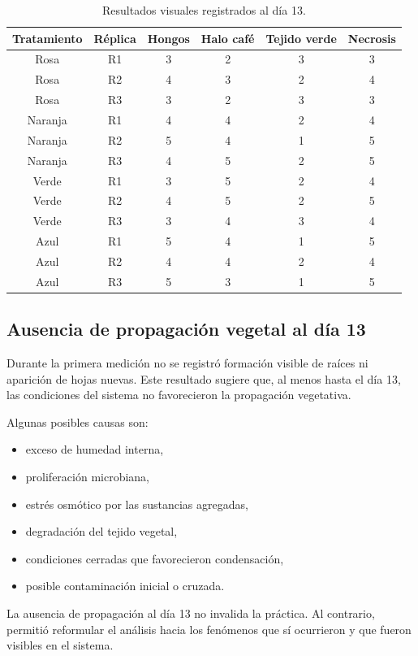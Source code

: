 \begin{table}[H]
\centering
\begin{tabular}{cccccc}
\hline
Tratamiento & Réplica & Hongos & Halo café & Tejido verde & Necrosis \\
\hline
Rosa & R1 & 3 & 2 & 3 & 3 \\
Rosa & R2 & 4 & 3 & 2 & 4 \\
Rosa & R3 & 3 & 2 & 3 & 3 \\
Naranja & R1 & 4 & 4 & 2 & 4 \\
Naranja & R2 & 5 & 4 & 1 & 5 \\
Naranja & R3 & 4 & 5 & 2 & 5 \\
Verde & R1 & 3 & 5 & 2 & 4 \\
Verde & R2 & 4 & 5 & 2 & 5 \\
Verde & R3 & 3 & 4 & 3 & 4 \\
Azul & R1 & 5 & 4 & 1 & 5 \\
Azul & R2 & 4 & 4 & 2 & 4 \\
Azul & R3 & 5 & 3 & 1 & 5 \\
\hline
\end{tabular}
\caption{Resultados visuales registrados al día 13.}
\end{table}

\subsection{Ausencia de propagación vegetal al día 13}

Durante la primera medición no se registró formación visible de raíces ni aparición de hojas nuevas. Este resultado sugiere que, al menos hasta el día 13, las condiciones del sistema no favorecieron la propagación vegetativa.

Algunas posibles causas son:

\begin{itemize}
\item exceso de humedad interna,
\item proliferación microbiana,
\item estrés osmótico por las sustancias agregadas,
\item degradación del tejido vegetal,
\item condiciones cerradas que favorecieron condensación,
\item posible contaminación inicial o cruzada.
\end{itemize}

La ausencia de propagación al día 13 no invalida la práctica. Al contrario, permitió reformular el análisis hacia los fenómenos que sí ocurrieron y que fueron visibles en el sistema.

